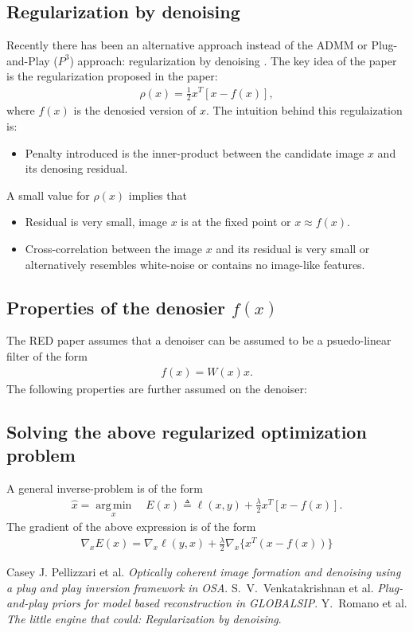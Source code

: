 \documentclass[a4paper, 11pt]{article}
\DeclareMathOperator*{\argmin}{arg\,min}
\begin{document}
\subsection{Regularization by denoising}
Recently there has been an alternative approach instead of the ADMM or Plug-and-Play ($P^3$) approach: regularization by denoising \cite{RED}. The key idea of the paper is the regularization proposed in the paper:
\begin{eqnarray*}
\rho(x)=\frac{1}{2}x^T[x-f(x)],  
\end{eqnarray*}
where $f(x)$ is the denosied version of $x$. The intuition behind this regulaization is:
\begin{itemize}
\item Penalty introduced is the inner-product between the candidate image $x$ and its denosing residual. 
\end{itemize}
A small value for $\rho(x)$ implies that 
\begin{itemize}
\item Residual is very small, image $x$ is at the fixed point or $x\approx f(x)$. 
\item Cross-correlation between the image $x$ and its residual is very small or alternatively resembles white-noise or contains no image-like features. 
\end{itemize}
\subsection{Properties of the denosier $f(x)$}
The RED paper assumes that a denoiser can be assumed to be a psuedo-linear filter of the form 
\begin{eqnarray*}
f(x)=W(x)x. 
\end{eqnarray*}
The following properties are further assumed on the denoiser:
\subsection{Solving the above regularized optimization problem}
A general inverse-problem is of the form 
\begin{eqnarray*}
\hat{x}=\underset{x}{\argmin} \quad E(x) \triangleq \ell(x,y)+\frac{\lambda}{2}x^T[x-f(x)]. 
\end{eqnarray*}
The gradient of the above expression is of the form 
\begin{eqnarray*}
\nabla_xE(x)=\nabla_x\ell(y,x)+\frac{\lambda}{2}\nabla_x\{x^T(x-f(x))\}
\end{eqnarray*}
\begin{thebibliography}{9}
 Casey J. Pellizzari et al. \emph{Optically coherent image formation and denoising using a plug and play inversion framework in OSA}.
 S.~V.~Venkatakrishnan et al. \emph{Plug-and-play priors for model based reconstruction in GLOBALSIP}.
 Y.~Romano et al. \emph{The little engine that could: Regularization by denoising}.
\end{thebibliography}
\end{document}
